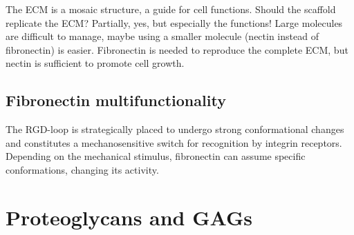 \noindent
The ECM is a mosaic structure, a guide for cell functions.
Should the scaffold replicate the ECM? Partially, yes, but especially the functions!
Large molecules are difficult to manage, maybe using a smaller molecule (nectin instead of fibronectin) is easier.
Fibronectin is needed to reproduce the complete ECM, but nectin is sufficient to promote cell growth.

\subsection{Fibronectin multifunctionality}
The RGD-loop is strategically placed to undergo strong conformational changes and constitutes a mechanosensitive switch for recognition by integrin receptors.
Depending on the mechanical stimulus, fibronectin can assume specific conformations, changing its activity.

\section{Proteoglycans and GAGs}


